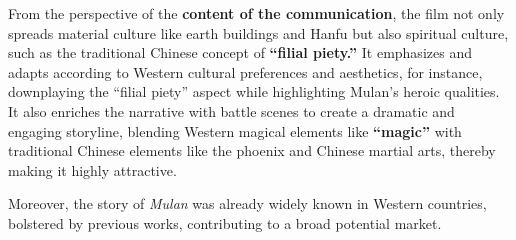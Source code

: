 From the perspective of the \textbf{content of the communication}, the film not only spreads material culture like earth buildings and Hanfu but also spiritual culture, such as the traditional Chinese concept of \textbf{``filial piety.''} It emphasizes and adapts according to Western cultural preferences and aesthetics, for instance, downplaying the ``filial piety'' aspect while highlighting Mulan's heroic qualities. It also enriches the narrative with battle scenes to create a dramatic and engaging storyline, blending Western magical elements like \textbf{``magic''} with traditional Chinese elements like the phoenix and Chinese martial arts, thereby making it highly attractive.

Moreover, the story of \textit{Mulan} was already widely known in Western countries, bolstered by previous works, contributing to a broad potential market.
